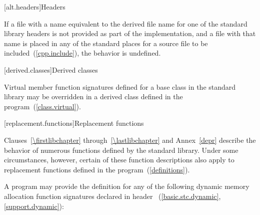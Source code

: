 [alt.headers]{Headers}

\pnum
If a file with a name
%
equivalent to the derived file name for one of the \Cpp standard library headers
is not provided as part of the implementation, and a file with that name
is placed in any of the standard places for a source file to be included~(\ref{cpp.include}),
the behavior is undefined.%
%

[derived.classes]{Derived classes}

\pnum
Virtual member function signatures defined
%
for a base class in the \Cpp standard
%
%
library may be overridden in a derived class defined in the program~(\ref{class.virtual}).

[replacement.functions]{Replacement functions}

\pnum
{}%
Clauses~\ref{\firstlibchapter} through~\ref{\lastlibchapter} and Annex~\ref{depr}
describe the behavior of numerous functions defined by
the \Cpp standard library.
Under some circumstances,
%
however, certain of these function descriptions also apply to replacement functions defined
in the program~(\ref{definitions}).

\pnum
A \Cpp program may provide the definition for any of the following
dynamic memory allocation function signatures declared in header
~(\ref{basic.stc.dynamic}, \ref{support.dynamic}):

